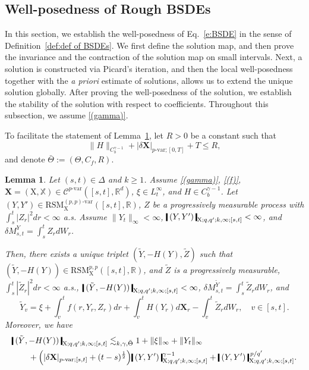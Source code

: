 \documentclass[11pt,reqno]{amsart}
\newtheorem{lemma}{Lemma}[section]
\numberwithin{equation}{section}
\def\R{\mathbb R}
\newcommand{\shortthickbar}{%
  \vcenter{\hbox{\rule{1.8pt}{2.2ex}}}%
}
\newcommand{\thicknm}[1]{%
  \mathopen{\shortthickbar}%
  \mkern4mu #1 \mkern4mu%
  \mathclose{\shortthickbar}%
}
\begin{document}
\subsection{Well-posedness of Rough BSDEs}\label{subsec:Rough BSDE with low regularity H} 

In this section, we establish the well-posedness of Eq.~\eqref{e:BSDE} in the sense of Definition~\ref{def:def of BSDEs}. We first define the solution map, and then prove the invariance and the contraction of the solution map on small intervals. Next, a solution is constructed via Picard's iteration, and then the local well-posedness together with the \emph{a priori} estimate of solutions, allows us to extend the unique solution globally. After proving the well-posedness of the solution, we establish the stability of the solution with respect to coefficients. Throughout this subsection, we assume \ref{(gamma)}. 

To facilitate the statement of Lemma~\ref{lem:solu map}, let $R > 0$ be a constant such that 
\begin{equation*}
\|H\|_{C^{\gamma - 1}_b} + |\delta \mathbf X|_{p\text{-}\mathrm{var};[0,T]} + T \le R,
\end{equation*}
and denote $\bar \Theta := (\Theta,C_f,R)$. 

\begin{lemma}\label{lem:solu map}
Let $(s,t) \in \Delta$ and $k \ge 1$. Assume \ref{(gamma)}, \ref{(f)}, $\mathbf X = (\mathrm X,\mathbb X) \in \mathscr C^{p\text{-}\mathrm{var}}([s,t],\R^d)$, $\xi \in L^{\infty}_{t}$, and $H \in C^{\gamma - 1}_b$. Let $(Y,Y') \in \mathrm{RSM}^{(p,p)\text{-}\mathrm{var}}_{\mathrm X}([s,t],\R)$, $Z$ be a progressively measurable process with $\int_{s}^{t} | Z_r |^2 dr < \infty$ a.s. Assume $\|Y_t\|_{\infty} < \infty$, $\thicknm{(Y,Y')}_{\mathrm X;q,q';k,\infty;[s,t]} < \infty$, and $\delta M^{Y}_{s,t} = \int_{s}^{t} Z_r dW_r$. 

Then, there exists a unique triplet $(\tilde Y,-H(Y),\tilde Z)$ such that $(\tilde Y,- H (Y)) \in \mathrm{RSM}^{p,p}_{\mathrm X}([s,t],\R)$, and $\tilde Z$ is a progressively measurable, $\int_{s}^{t} | \tilde Z_r |^2 dr < \infty$ a.s., $\thicknm{(\tilde Y,- H (Y))}_{\mathrm X;q,q';k,\infty;[s,t]} < \infty$, $\delta M^{\tilde Y}_{s,t} = \int_{s}^t \tilde Z_r dW_r$, and 
\begin{equation}\label{e:solu map} 
\tilde Y_v = \xi + \int_{v}^{t} f(r,Y_r,Z_r) dr + \int_v^t H(Y_r) d\mathbf X_r - \int_v^t \tilde Z_r dW_r,\quad v \in [s,t]. 
\end{equation}
Moreover, we have 
\begin{equation}\label{e:bound for solution map}
\begin{aligned}
&\thicknm{(\tilde Y,- H (Y))}_{\mathrm X;q,q';k,\infty;[s,t]} \lesssim_{k,\gamma,\bar \Theta} 1 + \|\xi\|_{\infty} + \|Y_t\|_{\infty} \\
&\qquad + \Big(|\delta \mathbf X|_{p\text{-}\mathrm{var};[s,t]} + (t - s)^{\frac{1}{2}}\Big) \thicknm{( Y,Y')}^{\gamma - 1}_{\mathrm X;q,q';k,\infty;[s,t]} + \thicknm{( Y,Y')}^{\,p/q'}_{\mathrm X;q,q';k,\infty;[s,t]}. 
\end{aligned}
\end{equation}
\end{lemma}
\end{document}

